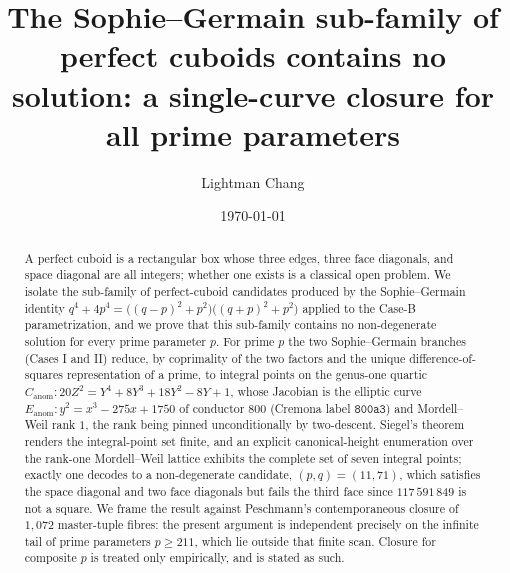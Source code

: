 \documentclass[11pt,reqno]{amsart}
\theoremstyle{plain}
\theoremstyle{definition}
\newcommand{\Eanom}{E_{\mathrm{anom}}}
\newcommand{\Canom}{C_{\mathrm{anom}}}
\begin{document}
\title[The Sophie--Germain sub-family of perfect cuboids]{The Sophie--Germain sub-family of perfect cuboids
contains no solution: a single-curve closure for all prime parameters}

\author{Lightman Chang}
\address{Independent Researcher}

\date{\today}



\begin{abstract}
A perfect cuboid is a rectangular box whose three edges, three face diagonals, and
space diagonal are all integers; whether one exists is a classical open problem. We
isolate the sub-family of perfect-cuboid candidates produced by the Sophie--Germain
identity $q^{4}+4p^{4}=\bigl((q-p)^{2}+p^{2}\bigr)\bigl((q+p)^{2}+p^{2}\bigr)$ applied to
the Case-B parametrization, and we prove that this sub-family contains no
non-degenerate solution for every prime parameter $p$. For prime $p$ the two
Sophie--Germain branches (Cases I and II) reduce, by coprimality of the two factors and
the unique difference-of-squares representation of a prime, to integral points on the
genus-one quartic $\Canom\colon 20Z^{2}=Y^{4}+8Y^{3}+18Y^{2}-8Y+1$, whose Jacobian is
the elliptic curve $\Eanom\colon y^{2}=x^{3}-275x+1750$ of conductor $800$
(Cremona label $\mathtt{800a3}$) and Mordell--Weil rank $1$, the rank being pinned
unconditionally by two-descent. Siegel's theorem renders the integral-point set
finite, and an explicit canonical-height enumeration over the rank-one Mordell--Weil
lattice exhibits the complete set of seven integral points; exactly one decodes to a
non-degenerate candidate, $(p,q)=(11,71)$, which satisfies the space diagonal and two
face diagonals but fails the third face since $117\,591\,849$ is not a square. We frame
the result against Peschmann's contemporaneous closure of $1{,}072$ master-tuple fibres:
the present argument is independent precisely on the infinite tail of prime parameters
$p\geq 211$, which lie outside that finite scan. Closure for composite $p$ is
treated only empirically, and is stated as such.
\end{abstract}

\maketitle
\end{document}
